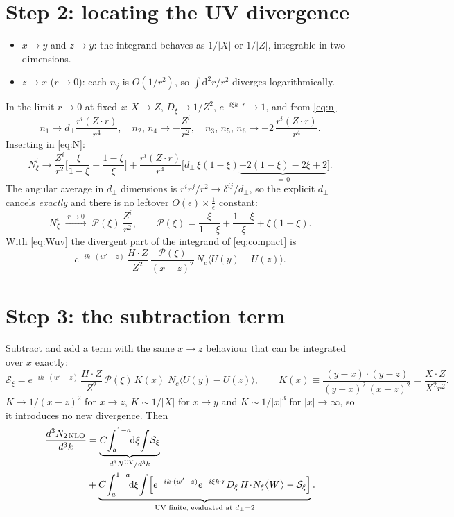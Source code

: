 \documentclass[11pt,a4paper]{article}
\newcommand{\dd}{\mathrm{d}}
\newcommand{\Nc}{N_c}
\newcommand{\cl}[1]{\big\langle #1\big\rangle}
\begin{document}
\section{Step 2: locating the UV divergence}
\begin{itemize}
\item $x\to y$ and $z\to y$: the integrand behaves as $1/|X|$ or $1/|Z|$, integrable in two dimensions.
\item $z\to x$ ($r\to0$): each $n_j$ is $O(1/r^2)$, so $\int \dd^2r/r^2$ diverges logarithmically.
\end{itemize}
In the limit $r\to0$ at fixed $z$: $X\to Z$, $D_\xi\to1/Z^2$, $e^{-i\xi k\cdot r}\to1$, and from \eqref{eq:n}
\begin{equation}
n_1\to d_\perp\frac{r^i(Z\cdot r)}{r^4},\quad
n_2,\,n_4\to-\frac{Z^i}{r^2},\quad
n_3,\,n_5,\,n_6\to-2\,\frac{r^i(Z\cdot r)}{r^4}.
\end{equation}
Inserting in \eqref{eq:N}:
\begin{equation}
N^i_\xi\to\frac{Z^i}{r^2}\Big[\frac{\xi}{1-\xi}+\frac{1-\xi}{\xi}\Big]
+\frac{r^i(Z\cdot r)}{r^4}\Big[d_\perp\,\xi(1-\xi)\underbrace{-2(1-\xi)-2\xi+2}_{=\,0}\Big].
\end{equation}
The angular average in $d_\perp$ dimensions is $r^ir^j/r^2\to\delta^{ij}/d_\perp$, so the explicit
$d_\perp$ cancels \emph{exactly} and there is no leftover $O(\epsilon)\times\frac1\epsilon$ constant:
\begin{equation}
\boxed{\;N^i_\xi\;\xrightarrow{\;r\to0\;}\;\mathcal P(\xi)\,\frac{Z^i}{r^2},\qquad
\mathcal P(\xi)=\frac{\xi}{1-\xi}+\frac{1-\xi}{\xi}+\xi(1-\xi).\;}
\end{equation}
With \eqref{eq:Wuv} the divergent part of the integrand of \eqref{eq:compact} is
\begin{equation}
e^{-ik\cdot(w'-z)}\,\frac{H\cdot Z}{Z^2}\,\frac{\mathcal P(\xi)}{(x-z)^2}\,\Nc\cl{U(y)-U(z)} .
\end{equation}

\section{Step 3: the subtraction term}
Subtract and add a term with the same $x\to z$ behaviour that can be integrated over $x$ exactly:
\begin{equation}
\mathcal S_\xi=e^{-ik\cdot(w'-z)}\,\frac{H\cdot Z}{Z^2}\,\mathcal P(\xi)\,K(x)\;\Nc\cl{U(y)-U(z)},
\qquad
K(x)\equiv\frac{(y-x)\cdot(y-z)}{(y-x)^2\,(x-z)^2}=\frac{X\cdot Z}{X^2r^2}.
\label{eq:S}
\end{equation}
$K\to1/(x-z)^2$ for $x\to z$, $K\sim1/|X|$ for $x\to y$ and $K\sim1/|x|^3$ for $|x|\to\infty$, so it
introduces no new divergence. Then
\begin{align}
\frac{d^{3}N_{2\,\rm NLO}}{d^{3}k}&=
\underbrace{C\!\int_a^{1-a}\!\!\dd\xi\!\int\!\mathcal S_\xi}_{d^3N^{\rm UV}/d^3k}\notag\\
&+\underbrace{C\!\int_a^{1-a}\!\!\dd\xi\!\int\!\Big[e^{-ik\cdot(w'-z)}e^{-i\xi k\cdot r}D_\xi\,H\!\cdot\!N_\xi\cl{W}-\mathcal S_\xi\Big]}_{\text{UV finite, evaluated at }d_\perp=2}.
\label{eq:split}
\end{align}
\end{document}
